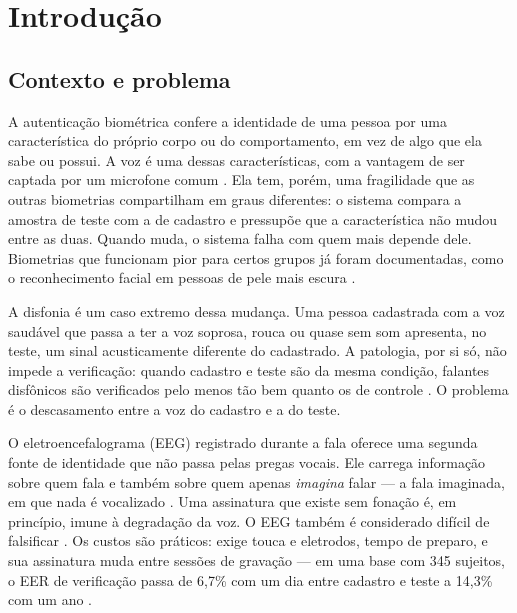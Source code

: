 \chapter{Introdução}
	\label{chap:intro}
	\section{Contexto e problema}

		\par A autenticação biométrica confere a identidade de uma pessoa por uma característica do próprio corpo ou do comportamento, em vez de algo que ela sabe ou possui. A voz é uma dessas características, com a vantagem de ser captada por um microfone comum \cite{hansen2015speaker}. Ela tem, porém, uma fragilidade que as outras biometrias compartilham em graus diferentes: o sistema compara a amostra de teste com a de cadastro e pressupõe que a característica não mudou entre as duas. Quando muda, o sistema falha com quem mais depende dele. Biometrias que funcionam pior para certos grupos já foram documentadas, como o reconhecimento facial em pessoas de pele mais escura \cite{grother2019frvt}.

		\par A disfonia é um caso extremo dessa mudança. Uma pessoa cadastrada com a voz saudável que passa a ter a voz soprosa, rouca ou quase sem som apresenta, no teste, um sinal acusticamente diferente do cadastrado. A patologia, por si só, não impede a verificação: quando cadastro e teste são da mesma condição, falantes disfônicos são verificados pelo menos tão bem quanto os de controle \cite{tayebiarasteh2023effect}. O problema é o descasamento entre a voz do cadastro e a do teste.

		\par O eletroencefalograma (\ac{EEG}) registrado durante a fala oferece uma segunda fonte de identidade que não passa pelas pregas vocais. Ele carrega informação sobre quem fala \cite{MOCTEZUMA2019201} e também sobre quem apenas \emph{imagina} falar --- a fala imaginada, em que nada é vocalizado \cite{brigham2010subject,derakhshesh2025cueless}. Uma assinatura que existe sem fonação é, em princípio, imune à degradação da voz. O \ac{EEG} também é considerado difícil de falsificar \cite{albaiati2025deep}. Os custos são práticos: exige touca e eletrodos, tempo de preparo, e sua assinatura muda entre sessões de gravação --- em uma base com 345 sujeitos, o \ac{EER} de verificação passa de 6,7\% com um dia entre cadastro e teste a 14,3\% com um ano \cite{fallahi2025advancing}.


